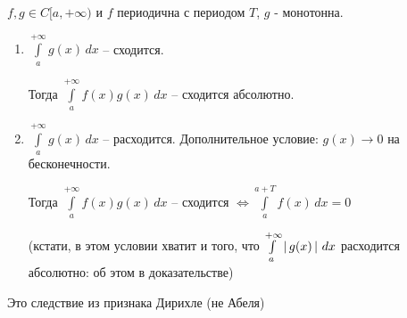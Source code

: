 \begin{consequence}\slashns
    
	$f, g \in C[a,+\infty)$ и $f$ периодична с периодом $T$, $g$ - монотонна.

    \begin{enumerate}
        \item $\int\limits_a^{+\infty} g(x)\, dx$ -- сходится. 

            Тогда $\int\limits_a^{+\infty}f(x) g(x)\, dx$ -- сходится абсолютно.
        
        \item $\int\limits_a^{+\infty} g(x)\, dx$ -- расходится. Дополнительное условие: $g(x) \to 0$ на бесконечности.

            Тогда $\int\limits_a^{+\infty}f(x) g(x)\, dx$ -- сходится $\iff \int\limits_a^{a+T} f(x)\, dx = 0$
            
            (кстати, в этом условии хватит и того, что $\int\limits_a^{+\infty} \left|\,{g(x)}\,\right|\, dx$ расходится абсолютно: об этом в доказательстве)

    \end{enumerate}

    Это следствие из признака Дирихле (не Абеля)

\end{consequence}

